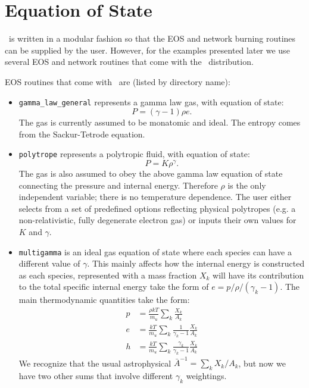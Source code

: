 \section{Equation of State}
\castro\ is written in a modular fashion so that the EOS and network
burning routines can be supplied by the user.   However, for the
examples presented later we use several EOS and network routines
that come with the \castro\ distribution.  

EOS routines that come with \castro\ are (listed by directory name):
\begin{itemize}

\item {\tt gamma\_law\_general} represents a gamma law gas, with equation of state:
\begin{equation}
  P = (\gamma - 1) \rho e.
\end{equation}
The gas is currently assumed to be monatomic and ideal. The entropy comes from the Sackur-Tetrode equation.

\item {\tt polytrope} represents a polytropic fluid, with equation of state:
\begin{equation}
  P = K \rho^\gamma.
\end{equation}
The gas is also assumed to obey the above gamma law equation of state
connecting the pressure and internal energy. Therefore $\rho$ is the
only independent variable; there is no temperature dependence. The
user either selects from a set of predefined options reflecting
physical polytropes (e.g. a non-relativistic, fully degenerate
electron gas) or inputs their own values for $K$ and $\gamma$.

\item {\tt multigamma} is an ideal gas equation of state where each
  species can have a different value of $\gamma$.  This mainly affects
  how the internal energy is constructed as each species, represented
  with a mass fraction $X_k$ will have its contribution to the total
  specific internal energy take the form of $e = p/\rho/(\gamma_k -
  1)$.  The main thermodynamic quantities take the form:
\begin{align}
p &= \frac{\rho k T}{m_u} \sum_k \frac{X_k}{A_k} \\
e &= \frac{k T}{m_u} \sum_k \frac{1}{\gamma_k - 1} \frac{X_k}{A_k} \\
h &= \frac{k T}{m_u} \sum_k \frac{\gamma_k}{\gamma_k - 1} \frac{X_k}{A_k}
\end{align}
We recognize that the usual astrophysical $\bar{A}^{-1} = \sum_k
X_k/A_k$, but now we have two other sums that involve different
$\gamma_k$ weightings.


\end{itemize}
